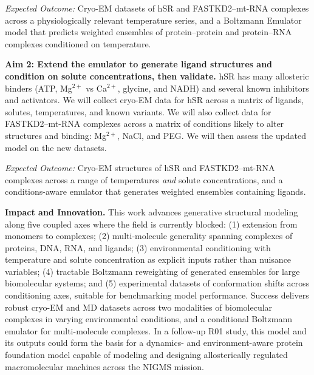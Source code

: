 \documentclass[11pt]{article}
\begin{document}
\emph{Expected Outcome:} Cryo-EM datasets of hSR and FASTKD2--mt-RNA complexes across a physiologically relevant temperature series, and a Boltzmann Emulator model that predicts weighted ensembles of protein--protein and protein--RNA complexes conditioned on temperature.

\textbf{Aim 2: Extend the emulator to generate ligand structures and condition on solute concentrations, then validate.}
hSR has many allosteric binders (ATP, Mg$^{2+}$ vs Ca$^{2+}$, glycine, and NADH) and several known inhibitors and activators. We will collect cryo-EM data for hSR across a matrix of ligands, solutes, temperatures, and known variants. We will also collect data for FASTKD2--mt-RNA complexes across a matrix of conditions likely to alter structures and binding: Mg$^{2+}$, NaCl, and PEG. We will then assess the updated model on the new datasets.

\emph{Expected Outcome:} Cryo-EM structures of hSR and FASTKD2--mt-RNA complexes across a range of temperatures \emph{and} solute concentrations, and a conditions-aware emulator that generates weighted ensembles containing ligands.

\textbf{Impact and Innovation.} This work advances generative structural modeling along five coupled axes where the field is currently blocked: (1) extension from monomers to complexes; (2) multi-molecule generality spanning complexes of proteins, DNA, RNA, and ligands; (3) environmental conditioning with temperature and solute concentration as explicit inputs rather than nuisance variables; (4) tractable Boltzmann reweighting of generated ensembles for large biomolecular systems; and (5) experimental datasets of conformation shifts across conditioning axes, suitable for benchmarking model performance. Success delivers robust cryo-EM and MD datasets across two modalities of biomolecular complexes in varying environmental conditions, and a conditional Boltzmann emulator for multi-molecule complexes. In a follow-up R01 study, this model and its outputs could form the basis for a dynamics- and environment-aware protein foundation model capable of modeling and designing allosterically regulated macromolecular machines across the NIGMS mission.
\end{document}
